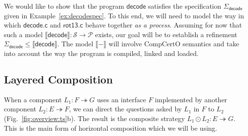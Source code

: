 \documentclass[acmsmall,screen,review,anonymous,nonacm]{acmart}
\newcommand{\kw}[1]{\ensuremath{ \mathsf{#1} }}
\begin{document}

\begin{example} \label{ex:decodesim} %
We would like to show that the program $\kw{decode}$
satisfies the specification $\Sigma_\kw{decode}$
given in Example~\ref{ex:decodespec}.
To this end,
we will need to model the way in which
$\kw{decode.c}$ and $\kw{rot13.c}$ behave together
\emph{as a process}.
Assuming for now that such a model
$\llbracket \kw{decode} \rrbracket :
 \mathcal{S} \rightarrow \mathcal{P}$
exists,
our goal will be to establish a refinement
$
  \Sigma_\kw{decode}
  \le
  \llbracket \kw{decode} \rrbracket
$.
The model $\llbracket - \rrbracket$ will involve CompCertO semantics
and take into account the way the program is
compiled, linked and loaded.
\end{example}


\subsection{Layered Composition} %

When a component $L_1 : F \twoheadrightarrow G$
uses an interface $F$ implemented by
another component $L_2 : E \twoheadrightarrow F$,
we can direct the questions asked by $L_1$ in $F$ to $L_2$
(Fig.~\ref{fig:overview:ts}b).
The result is the composite strategy
$L_1 \odot L_2 : E \twoheadrightarrow G$. %
This is the main form of horizontal composition which we will be using.
\end{document}
